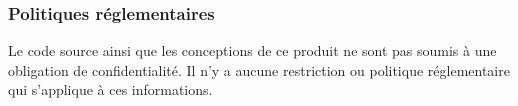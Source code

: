\subsubsection{Politiques réglementaires}
Le code source ainsi que les conceptions de ce produit ne sont pas soumis à une obligation de confidentialité. Il n'y a aucune restriction ou politique réglementaire qui s'applique à ces informations. 